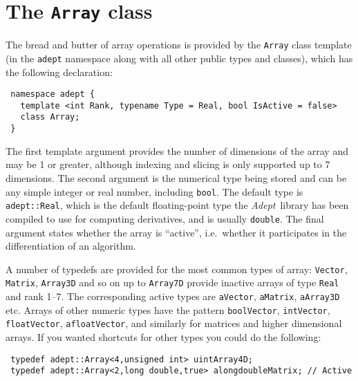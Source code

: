 \documentclass[a4,oneside]{book}
\def\codesize{\small}
\def\Adept{\emph{Adept}}
\def\code#1{{\codesize\texttt{#1}}}
\def\codestyle#1{\texttt{#1}}
\begin{document}
\section{The \codestyle{Array} class}
\label{sec:array}
The bread and butter of array operations is provided by the
\code{Array} class template (in the \code{adept} namespace along with
all other public types and classes), which has the following declaration:
\begin{lstlisting}
 namespace adept {
   template <int Rank, typename Type = Real, bool IsActive = false>
   class Array;
 }
\end{lstlisting}
The first template argument provides the number of dimensions of the
array and may be 1 or greater, although indexing and slicing is only
supported up to 7 dimensions. The second argument is the numerical
type being stored and can be any simple integer or real number,
including \code{bool}. The default type is \code{adept::Real}, which
is the default floating-point type the \Adept\ library has been
compiled to use for computing derivatives, and is usually
\code{double}. The final argument states whether the array is
``active'', i.e.\ whether it participates in the differentiation of an
algorithm.

A number of typedefs are provided for the most common types of array:
\code{Vector}, \code{Matrix}, \code{Array3D} and so on up to
\code{Array7D} provide inactive arrays of type \code{Real} and rank
1--7. The corresponding active types are \code{aVector},
\code{aMatrix}, \code{aArray3D} etc. Arrays of other numeric types
have the pattern \code{boolVector}, \code{intVector},
\code{floatVector}, \code{afloatVector}, and similarly for matrices
and higher dimensional arrays. If you wanted shortcuts for
other types you could do the following:
\begin{lstlisting}
 typedef adept::Array<4,unsigned int> uintArray4D;
 typedef adept::Array<2,long double,true> alongdoubleMatrix; // Active
\end{lstlisting}
\end{document}
